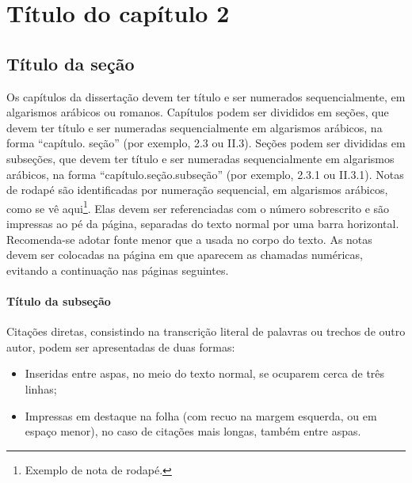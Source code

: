 \documentclass[a4paper,12pt,oneside]{book}
\begin{document}
\pagestyle{plain}
\setcounter{page}{1} %
\newpage

\chapter{Título do capítulo 2}

\section{Título da seção}

Os capítulos da dissertação devem ter título e ser numerados sequencialmente,
em algarismos arábicos ou romanos. Capítulos podem ser divididos em seções, que
devem ter título e ser numeradas sequencialmente em algarismos arábicos, na forma
“capítulo. seção” (por exemplo, 2.3 ou II.3).
Seções podem ser divididas em subseções, que devem ter título e ser numeradas
sequencialmente em algarismos arábicos, na forma “capítulo.seção.subseção” (por
exemplo, 2.3.1 ou II.3.1).
Notas de rodapé são identificadas por numeração sequencial, em algarismos
arábicos, como se vê aqui\footnote{Exemplo de nota de rodapé.}. Elas devem ser referenciadas com o número sobrescrito e
são impressas ao pé da página, separadas do texto normal por uma barra horizontal.
Recomenda-se adotar fonte menor que a usada no corpo do texto. As notas devem ser
colocadas na página em que aparecem as chamadas numéricas, evitando a continuação
nas páginas seguintes.

\subsubsection{Título da subseção}

Citações diretas, consistindo na transcrição literal de palavras ou trechos de
outro autor, podem ser apresentadas de duas formas:

\begin{itemize}

\item[i.] Inseridas entre aspas, no meio do texto normal, se ocuparem cerca de três linhas;
 
\item[ii.] Impressas em destaque na folha (com recuo na margem esquerda, ou em espaço
menor), no caso de citações mais longas, também entre aspas.

\end{itemize}
\end{document}
